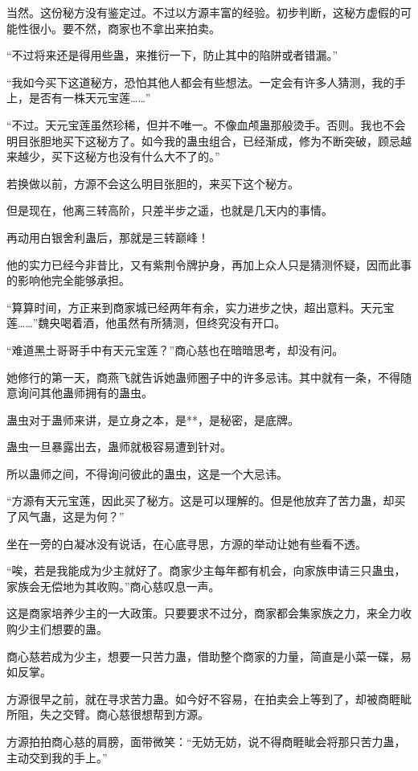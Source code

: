 \begin{this_body}
当然。这份秘方没有鉴定过。不过以方源丰富的经验。初步判断，这秘方虚假的可能性很小。要不然，商家也不拿出来拍卖。

“不过将来还是得用些蛊，来推衍一下，防止其中的陷阱或者错漏。”

“我如今买下这道秘方，恐怕其他人都会有些想法。一定会有许多人猜测，我的手上，是否有一株天元宝莲……”

“不过。天元宝莲虽然珍稀，但并不唯一。不像血颅蛊那般烫手。否则。我也不会明目张胆地买下这秘方了。如今我的蛊虫组合，已经渐成，修为不断突破，顾忌越来越少，买下这秘方也没有什么大不了的。”

若换做以前，方源不会这么明目张胆的，来买下这个秘方。

但是现在，他离三转高阶，只差半步之遥，也就是几天内的事情。

再动用白银舍利蛊后，那就是三转巅峰！

他的实力已经今非昔比，又有紫荆令牌护身，再加上众人只是猜测怀疑，因而此事的影响他完全能够承担。

“算算时间，方正来到商家城已经两年有余，实力进步之快，超出意料。天元宝莲……”魏央喝着酒，他虽然有所猜测，但终究没有开口。

“难道黑土哥哥手中有天元宝莲？”商心慈也在暗暗思考，却没有问。

她修行的第一天，商燕飞就告诉她蛊师圈子中的许多忌讳。其中就有一条，不得随意询问其他蛊师拥有的蛊虫。

蛊虫对于蛊师来讲，是立身之本，是**，是秘密，是底牌。

蛊虫一旦暴露出去，蛊师就极容易遭到针对。

所以蛊师之间，不得询问彼此的蛊虫，这是一个大忌讳。

“方源有天元宝莲，因此买了秘方。这是可以理解的。但是他放弃了苦力蛊，却买了风气蛊，这是为何？”

坐在一旁的白凝冰没有说话，在心底寻思，方源的举动让她有些看不透。

“唉，若是我能成为少主就好了。商家少主每年都有机会，向家族申请三只蛊虫，家族会无偿地为其收购。”商心慈叹息一声。

这是商家培养少主的一大政策。只要要求不过分，商家都会集家族之力，来全力收购少主们想要的蛊。

商心慈若成为少主，想要一只苦力蛊，借助整个商家的力量，简直是小菜一碟，易如反掌。

方源很早之前，就在寻求苦力蛊。如今好不容易，在拍卖会上等到了，却被商睚眦所阻，失之交臂。商心慈很想帮到方源。

方源拍拍商心慈的肩膀，面带微笑：“无妨无妨，说不得商睚眦会将那只苦力蛊，主动交到我的手上。”


\end{this_body}
